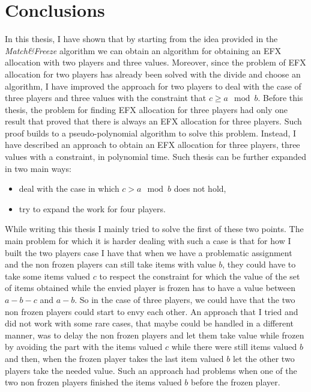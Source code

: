 \chapter{Conclusions}
In this thesis, I have shown that by starting from the idea provided in the \textit{Match\&Freeze} algorithm \cite{DBLP:MaximumNashWelfareandOtherStoriesAboutEFX} we can obtain an algorithm for obtaining an EFX allocation with two players and three values. Moreover, since the problem of EFX allocation for two players has already been solved with the divide and choose an algorithm, I have improved the approach for two players to deal with the case of three players and three values with the constraint that $c \ge a \mod b$. Before this thesis, the problem for finding EFX allocation for three players had only one result that proved that there is always an EFX allocation for three players. Such proof builds to a pseudo-polynomial algorithm to solve this problem. Instead, I have described an approach to obtain an EFX allocation for three players, three values with a constraint, in polynomial time. Such thesis can be further expanded in two main ways: 
\begin{itemize}
    \item deal with the case in which  $c > a \mod b$ does not hold,
    \item try to expand the work for four players.
\end{itemize}

While writing this thesis I mainly tried to solve the first of these two points. The main problem for which it is harder dealing with such a case is that for how I built the two players case I have that when we have a problematic assignment and the non frozen players can still take items with value $b$, they could have to take some items valued $c$ to respect the constraint for which the value of the set of items obtained while the envied player is frozen has to have a value between $a-b-c$ and $a-b$. So in the case of three players, we could have that the two non frozen players could start to envy each other. An approach that I tried and did not work with some rare cases, that maybe could be handled in a different manner, was to delay the non frozen players and let them take value while frozen by avoiding the part with the items valued $c$ while there were still items valued $b$ and then, when the frozen player takes the last item valued $b$ let the other two players take the needed value. Such an approach had problems when one of the two non frozen players finished the items valued $b$ before the frozen player.